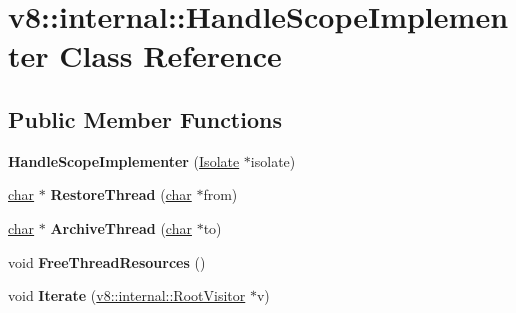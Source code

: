 \hypertarget{classv8_1_1internal_1_1HandleScopeImplementer}{}\section{v8\+:\+:internal\+:\+:Handle\+Scope\+Implementer Class Reference}
\label{classv8_1_1internal_1_1HandleScopeImplementer}
\subsection*{Public Member Functions}
\begin{DoxyCompactItemize}
\item 
\mbox{\label{classv8_1_1internal_1_1HandleScopeImplementer_a8a8b3601372eacaddfe9eae275e7bdc5}} 
{\bfseries Handle\+Scope\+Implementer} (\mbox{\hyperlink{classv8_1_1internal_1_1Isolate}{Isolate}} $\ast$isolate)
\item 
\mbox{\label{classv8_1_1internal_1_1HandleScopeImplementer_aba36eab4b28babfa77c6c4e033e588c7}} 
\mbox{\hyperlink{classchar}{char}} $\ast$ {\bfseries Restore\+Thread} (\mbox{\hyperlink{classchar}{char}} $\ast$from)
\item 
\mbox{\label{classv8_1_1internal_1_1HandleScopeImplementer_a62d016202e4b0555cea27a762608b275}} 
\mbox{\hyperlink{classchar}{char}} $\ast$ {\bfseries Archive\+Thread} (\mbox{\hyperlink{classchar}{char}} $\ast$to)
\item 
\mbox{\label{classv8_1_1internal_1_1HandleScopeImplementer_a3e23aca523c7e6549024c75f7985ea34}} 
void {\bfseries Free\+Thread\+Resources} ()
\item 
\mbox{\label{classv8_1_1internal_1_1HandleScopeImplementer_a58970d2e9a1292fd9b41c1e2986fa0a2}} 
void {\bfseries Iterate} (\mbox{\hyperlink{classv8_1_1internal_1_1RootVisitor}{v8\+::internal\+::\+Root\+Visitor}} $\ast$v)
\item 
\mbox{\label{classv8_1_1internal_1_1HandleScopeImplementer_a4836bd3e2b4aa3a84895d53ce8178921}} 

\end{DoxyCompactItemize}
